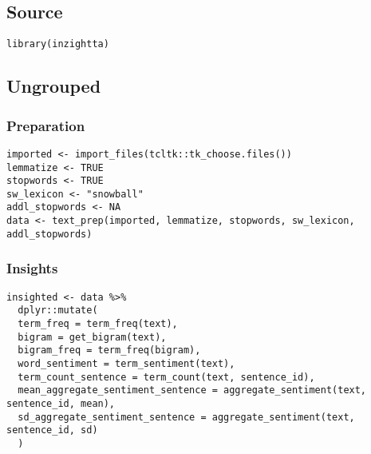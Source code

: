 \documentclass[a4paper, 11pt]{article}
\begin{document}
\subsection{Source}
\label{sec:org0e68fee}
\begin{verbatim}
library(inzightta)
\end{verbatim}

\subsection{Ungrouped}
\label{sec:orge2dbfc4}
\subsubsection{Preparation}
\label{sec:org65dc527}
\begin{verbatim}
imported <- import_files(tcltk::tk_choose.files())
lemmatize <- TRUE
stopwords <- TRUE
sw_lexicon <- "snowball"
addl_stopwords <- NA
data <- text_prep(imported, lemmatize, stopwords, sw_lexicon, addl_stopwords)
\end{verbatim}

\subsubsection{Insights}
\label{sec:org421ce4d}
\begin{verbatim}
insighted <- data %>%
  dplyr::mutate(
  term_freq = term_freq(text),
  bigram = get_bigram(text),
  bigram_freq = term_freq(bigram),
  word_sentiment = term_sentiment(text),
  term_count_sentence = term_count(text, sentence_id),
  mean_aggregate_sentiment_sentence = aggregate_sentiment(text, sentence_id, mean),
  sd_aggregate_sentiment_sentence = aggregate_sentiment(text, sentence_id, sd)
  )
\end{verbatim}
\end{document}
